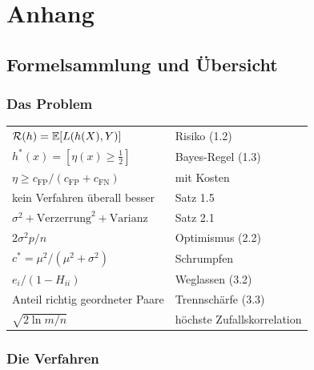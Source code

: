 \appendix
\part{Anhang}

\newcommand{\lit}[3]{\vspace{5pt}\noindent\textbf{[#1]} #2\par\nopagebreak\vspace{1pt}{\small\itshape\color{grau} #3}\par\vspace{2pt}}

\chapter{Formelsammlung und Übersicht}

\section{Das Problem}

\begin{merksatz}
\begin{center}
{\small
\renewcommand{\arraystretch}{1.62}
\begin{tabular}{@{}P{4.4cm}P{4.2cm}@{}}
\toprule
$\mathcal{R}(h) = \mathbb{E}[L(h(X),Y)]$ & Risiko (1.2)\\
$h^{*}(x) = [\eta(x) \ge \tfrac12]$ & Bayes-Regel (1.3)\\
$\eta \ge c_{\text{FP}}/(c_{\text{FP}}+c_{\text{FN}})$ & mit Kosten\\
kein Verfahren überall besser & Satz 1.5\\
$\sigma^{2} + \text{Verzerrung}^{2} + \text{Varianz}$ & Satz 2.1\\
$2\sigma^{2}p/n$ & Optimismus (2.2)\\
$c^{*} = \mu^{2}/(\mu^{2}+\sigma^{2})$ & Schrumpfen\\
$e_i/(1-H_{ii})$ & Weglassen (3.2)\\
Anteil richtig geordneter Paare & Trennschärfe (3.3)\\
$\sqrt{2\ln m/n}$ & höchste Zufallskorrelation\\
\bottomrule
\end{tabular}}
\end{center}
\end{merksatz}

\section{Die Verfahren}

